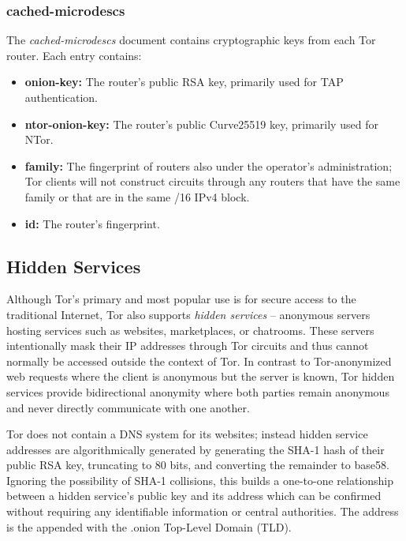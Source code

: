\subsubsection{cached-microdescs}

The \emph{cached-microdescs} document contains cryptographic keys from each Tor router. Each entry contains:

\begin{itemize}
	\item \textbf{onion-key:} The router's public RSA key, primarily used for TAP authentication.
	\item \textbf{ntor-onion-key:} The router's public Curve25519 key, primarily used for NTor.
	\item \textbf{family:} The fingerprint of routers also under the operator's administration; Tor clients will not construct circuits through any routers that have the same family or that are in the same /16 IPv4 block.
	\item \textbf{id:} The router's fingerprint.
\end{itemize}

\subsection{Hidden Services}
\label{sec:HiddenServices}

Although Tor's primary and most popular use is for secure access to the traditional Internet, Tor also supports \emph{hidden services} -- anonymous servers hosting services such as websites, marketplaces, or chatrooms. These servers intentionally mask their IP addresses through Tor circuits and thus cannot normally be accessed outside the context of Tor. In contrast to Tor-anonymized web requests where the client is anonymous but the server is known, Tor hidden services provide bidirectional anonymity where both parties remain anonymous and never directly communicate with one another.\cite{nicolussi2011human}

Tor does not contain a DNS system for its websites; instead hidden service addresses are algorithmically generated by generating the SHA-1 hash of their public RSA key, truncating to 80 bits, and converting the remainder to base58. Ignoring the possibility of SHA-1 collisions, this builds a one-to-one relationship between a hidden service's public key and its address which can be confirmed without requiring any identifiable information or central authorities. The address is the appended with the .onion Top-Level Domain (TLD).

